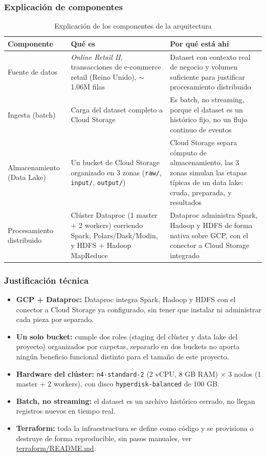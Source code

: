 \subsubsection*{Explicación de componentes}

\begin{table}[H]
\centering
\small
\begin{tabular}{p{3.4cm}p{4.8cm}p{4.8cm}}
\toprule
\textbf{Componente} & \textbf{Qué es} & \textbf{Por qué está ahí} \\
\midrule
Fuente de datos & \emph{Online Retail II}, transacciones de e-commerce retail (Reino Unido), $\sim$1.06M filas & Dataset con contexto real de negocio y volumen suficiente para justificar procesamiento distribuido \\
\addlinespace
Ingesta (batch) & Carga del dataset completo a Cloud Storage & Es batch, no streaming, porque el dataset es un histórico fijo, no un flujo continuo de eventos \\
\addlinespace
Almacenamiento (Data Lake) & Un bucket de Cloud Storage organizado en 3 zonas (\texttt{raw/}, \texttt{input/}, \texttt{output/}) & Cloud Storage separa cómputo de almacenamiento, las 3 zonas simulan las etapas típicas de un data lake: cruda, preparada, y resultados \\
\addlinespace
Procesamiento distribuido & Clúster Dataproc (1 master + 2 workers) corriendo Spark, Polars/Dask/Modin, y HDFS + Hadoop MapReduce & Dataproc administra Spark, Hadoop y HDFS de forma nativa sobre GCP, con el conector a Cloud Storage integrado \\
\bottomrule
\end{tabular}
\caption{Explicación de los componentes de la arquitectura}
\end{table}

\subsubsection*{Justificación técnica}

\begin{itemize}
    \item \textbf{GCP + Dataproc:} Dataproc integra Spark, Hadoop y HDFS con el conector a Cloud Storage ya configurado, sin tener que instalar ni administrar cada pieza por separado.
    \item \textbf{Un solo bucket:} cumple dos roles (staging del clúster y data lake del proyecto) organizados por carpetas, separarlo en dos buckets no aporta ningún beneficio funcional distinto para el tamaño de este proyecto.
    \item \textbf{Hardware del clúster:} \texttt{n4-standard-2} (2 vCPU, 8 GB RAM) $\times$ 3 nodos (1 master + 2 workers), con disco \texttt{hyperdisk-balanced} de 100 GB.
    \item \textbf{Batch, no streaming:} el dataset es un archivo histórico cerrado, no llegan registros nuevos en tiempo real.
    \item \textbf{Terraform:} toda la infraestructura se define como código y se provisiona o destruye de forma reproducible, sin pasos manuales, ver \url{terraform/README.md}.
\end{itemize}

